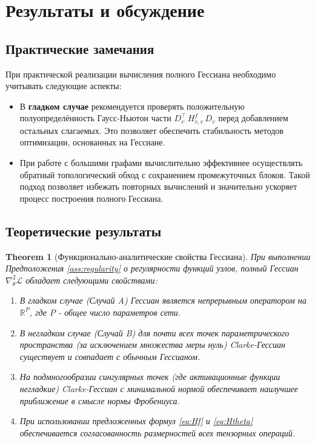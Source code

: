 \documentclass[11pt]{article}
\newtheorem{theorem}{Theorem}
\begin{document}
\section{Результаты и обсуждение}

\subsection{Практические замечания}

При практической реализации вычисления полного Гессиана необходимо учитывать следующие аспекты:

\begin{itemize}
  \item В \textbf{гладком случае} рекомендуется проверять положительную полуопределённость Гаусс-Ньютон части
    $D_v^\top\,H^f_{v,v}\,D_v$ перед добавлением остальных слагаемых. Это позволяет обеспечить стабильность
    методов оптимизации, основанных на Гессиане.

  \item При работе с большими графами вычислительно эффективнее осуществлять обратный топологический обход с
    сохранением промежуточных блоков. Такой подход позволяет избежать повторных вычислений и значительно
    ускоряет процесс построения полного Гессиана.
\end{itemize}

\subsection{Теоретические результаты}

\begin{theorem}[Функционально-аналитические свойства Гессиана]
  При выполнении Предположения \ref{ass:regularity} о регулярности функций узлов, полный Гессиан
  $\nabla^2_\theta \mathcal{L}$ обладает следующими свойствами:
  \begin{enumerate}
    \item В гладком случае (Случай A) Гессиан является непрерывным оператором на $\mathbb{R}^P$, где $P$ -
      общее число параметров сети.
    \item В негладком случае (Случай B) для почти всех точек параметрического пространства (за исключением
      множества меры нуль) Clarke-Гессиан существует и совпадает с обычным Гессианом.
    \item На подмногообразии сингулярных точек (где активационные функции негладкие) Clarke-Гессиан с
      минимальной нормой обеспечивает наилучшее приближение в смысле нормы Фробениуса.
    \item При использовании предложенных формул \eqref{eq:Hf} и \eqref{eq:Htheta} обеспечивается
      согласованность размерностей всех тензорных операций.
  \end{enumerate}
\end{theorem}
\end{document}
